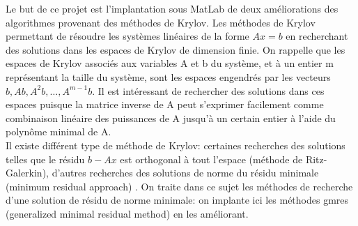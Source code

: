 Le but de ce projet est l'implantation sous MatLab de deux améliorations des algorithmes provenant des méthodes de Krylov. Les méthodes de Krylov permettant de résoudre les systèmes linéaires de la forme \(Ax = b\) en recherchant des solutions dans les espaces de Krylov de dimension finie. On rappelle que les espaces de Krylov associés aux variables A et b du système, et à un entier m représentant la taille du système, sont les espaces engendrés par les vecteurs \(b, Ab, A^2b, … , A^{m-1}b\). Il est intéressant de rechercher des solutions dans ces espaces puisque la matrice inverse de A peut s'exprimer facilement comme combinaison linéaire des puissances de A jusqu'à un certain entier à l'aide du polynôme minimal de A.\\ 

	Il existe différent type de méthode de Krylov: certaines recherches des solutions telles que le résidu \(b-Ax\) est orthogonal à tout l'espace (méthode de Ritz-Galerkin), d'autres recherches des solutions de norme du résidu minimale (minimum residual approach) . On traite dans ce sujet les méthodes de recherche d'une solution de résidu de norme minimale: on implante ici les méthodes gmres (generalized minimal residual method) en les améliorant.